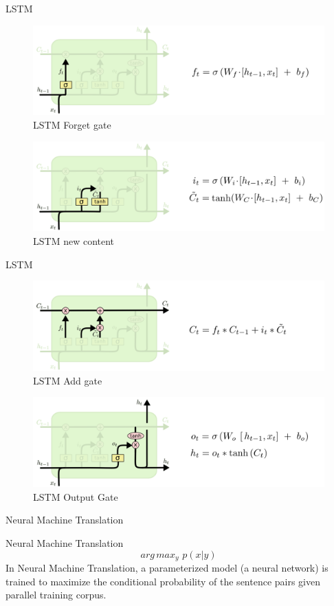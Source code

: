 ﻿\documentclass[table,aspectratio=43,mathserif,xcolor={usenames,dvipsnames,svgnames,table},10pt]{beamer}
\begin{document}
\begin{frame}{LSTM}
 \begin{figure}[h]
    \includegraphics[width=0.6\linewidth]{images/lstm_forget.png}  
    \caption{LSTM Forget gate}
  \end{figure}
   \begin{figure}[h]
    \includegraphics[width=0.6\linewidth]{images/lstm_add.png}  
    \caption{LSTM new content}
  \end{figure}
\end{frame}


\begin{frame}{LSTM}
 \begin{figure}[h]
    \includegraphics[width=0.6\linewidth]{images/lstm_add1.png}  
    \caption{LSTM Add gate}
  \end{figure}
   \begin{figure}[h]
    \includegraphics[width=0.6\linewidth]{images/lstm_output.png}  
    \caption{LSTM Output Gate}
  \end{figure}
\end{frame}


\begin{section}{Neural Machine Translation}
\end{section}

\begin{frame}{Neural Machine Translation}
 $$ arg\,max _{y}  \,\, p(x|y)$$
 In Neural Machine Translation, a parameterized model (a neural network) is trained to maximize the conditional probability of the sentence pairs given parallel training corpus.
\end{frame}
\end{document}
